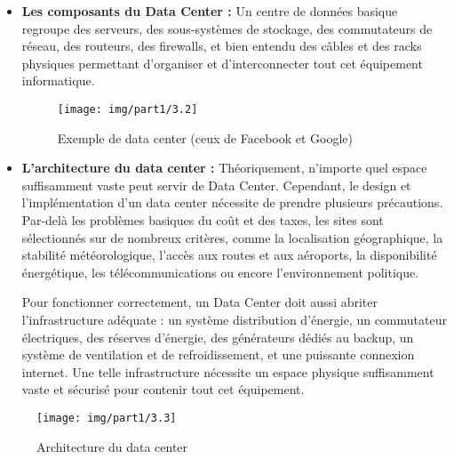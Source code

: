 \begin{itemize}
\item  \textbf{Les composants du Data Center :} Un centre de données basique regroupe des serveurs, des sous-systèmes de stockage, des commutateurs de réseau, des routeurs, des firewalls, et bien entendu des câbles et des racks physiques permettant d'organiser et d'interconnecter tout cet équipement informatique.
\begin{figure}[h]
	\centering
	\texttt{[image: img/part1/3.2]}
	\caption{Exemple de data center (ceux de Facebook et Google)}
\end{figure}
\bigskip \bigskip \bigskip \bigskip
\item  \textbf{L'architecture du data center :} Théoriquement, n'importe quel espace suffisamment vaste peut servir de Data Center. Cependant, le design et l'implémentation d'un data center nécessite de prendre plusieurs précautions. Par-delà les problèmes basiques du coût et des taxes, les sites sont sélectionnés sur de nombreux critères, comme la localisation géographique, la stabilité météorologique, l'accès aux routes et aux aéroports, la disponibilité énergétique, les télécommunications ou encore l'environnement politique.

Pour fonctionner correctement, un Data Center doit aussi abriter l'infrastructure adéquate : un système distribution d'énergie, un commutateur électriques, des réserves d'énergie, des générateurs dédiés au backup, un système de ventilation et de refroidissement, et une puissante connexion internet. Une telle infrastructure nécessite un espace physique suffisamment vaste et sécurisé pour contenir tout cet équipement.
\end{itemize}
\begin{figure}[h]
	\centering
	\texttt{[image: img/part1/3.3]}
	\caption{Architecture du data center}
\end{figure}





